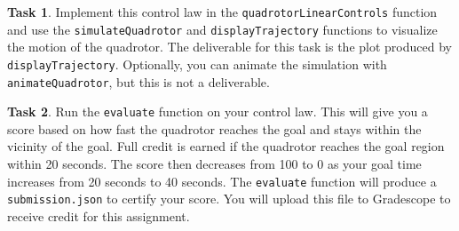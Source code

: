 \documentclass{article}
\theoremstyle{definition}
\newtheorem{task}{Task}
\begin{document}
\begin{task}
    Implement this control law in the \texttt{quadrotorLinearControls} function and use the \texttt{simulateQuadrotor} and \texttt{displayTrajectory} functions to visualize the motion of the quadrotor.
    The deliverable for this task is the plot produced by \texttt{displayTrajectory}.
Optionally, you can animate the simulation with \texttt{animateQuadrotor}, but this is not a deliverable.
\end{task}

% 

\begin{task}
    Run the \texttt{evaluate} function on your control law. This will give you a score based on how fast the quadrotor reaches the goal and stays within the vicinity of the goal. Full credit is earned if the quadrotor reaches the goal region within 20 seconds. The score then decreases from 100 to 0 as your goal time increases from 20 seconds to 40 seconds.
The \texttt{evaluate} function will produce a \texttt{submission.json} to certify your score. You will upload this file to Gradescope to receive credit for this assignment.
\end{task}
\end{document}
